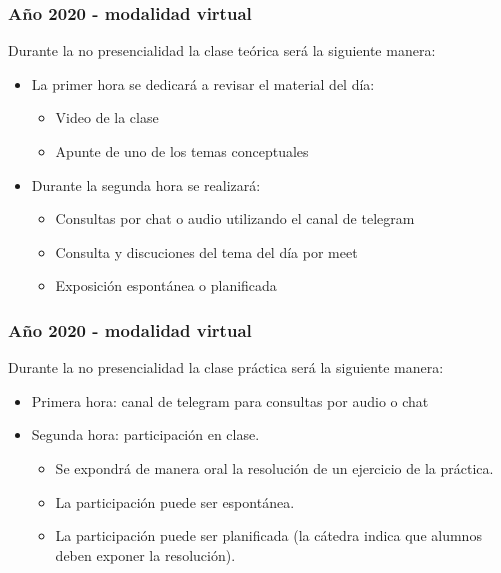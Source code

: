 \documentclass[aspectratio=169,compress]{beamer}
\begin{document}
\begin{frame}[fragile]
  \frametitle{Año 2020 - modalidad virtual}
  Durante la no presencialidad la clase teórica será la siguiente manera:

\bigskip
\begin{itemize}
\item La primer hora se dedicará a revisar el material del día:
\begin{itemize}
\item Video de la clase
\item Apunte de uno de los temas conceptuales
\end{itemize}
\end{itemize}

\bigskip

\begin{itemize}
\item Durante la segunda hora se realizará:
\begin{itemize}
\item Consultas por chat o audio utilizando el canal de telegram
\item Consulta y discuciones del tema del día por meet
\item Exposición espontánea o planificada
\end{itemize}
\end{itemize}

\end{frame}


\begin{frame}[fragile]
  \frametitle{Año 2020 - modalidad virtual}
  Durante la no presencialidad la clase práctica será la siguiente manera:

\bigskip
\begin{itemize}
\item Primera hora: canal de telegram para consultas por audio o chat
\bigskip
\item Segunda hora: participación en clase.
\begin{itemize}
\item Se expondrá de manera oral la resolución de un ejercicio de la práctica.
\item La participación puede ser espontánea.
\item La participación puede ser planificada (la cátedra indica que alumnos deben exponer la resolución).
\end{itemize}
\end{itemize}

\end{frame}
\end{document}
